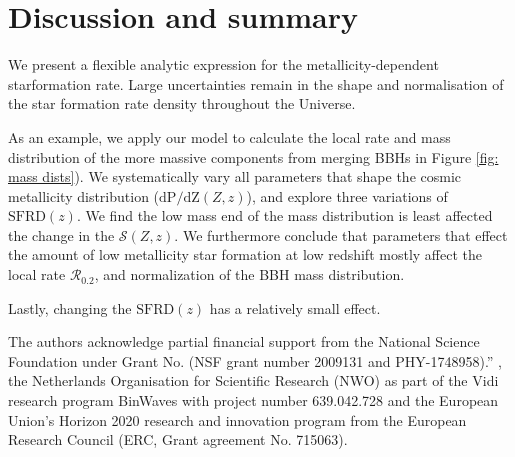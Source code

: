 \documentclass[twocolumn]{aastex631}
\newcommand{\SFRDzZ}{\ensuremath{\mathcal{S}(Z,z)}\xspace}
\newcommand{\SFRDz}{\ensuremath{\mathrm{SFRD}(z)}\xspace}
\newcommand{\dpdZ}{\ensuremath{\mathrm{dP/dZ}(Z,z)}\xspace}
\begin{document}
\section{Discussion and summary \label{sec: summary}}

We present a flexible analytic expression for the metallicity-dependent starformation rate.
Large uncertainties remain in the shape and normalisation of the star formation rate density throughout the Universe. 


As an example, we apply our model to calculate the local rate and mass distribution of the more massive components from merging BBHs in Figure \ref{fig: mass dists}). 
We systematically vary all parameters that shape the cosmic metallicity distribution (\dpdZ), and explore three variations of \SFRDz. 
We find the low mass end of the mass distribution is least affected the change in the \SFRDzZ. 
%
We furthermore conclude that parameters that effect the amount of low metallicity star formation at low redshift mostly affect the local rate $\mathcal{R}_{0.2}$, and normalization of the BBH mass distribution.


%
Lastly, changing the \SFRDz has a relatively small effect.


\begin{acknowledgments}
The authors acknowledge partial financial support from the  National Science Foundation under Grant No. (NSF grant number 2009131  and PHY-1748958).”
, the Netherlands Organisation for Scientific Research (NWO) as part of the Vidi research program BinWaves with project number 639.042.728 and the European Union’s Horizon 2020 research and innovation program from the European Research Council (ERC, Grant agreement No. 715063). 
\end{acknowledgments}



\end{document}
